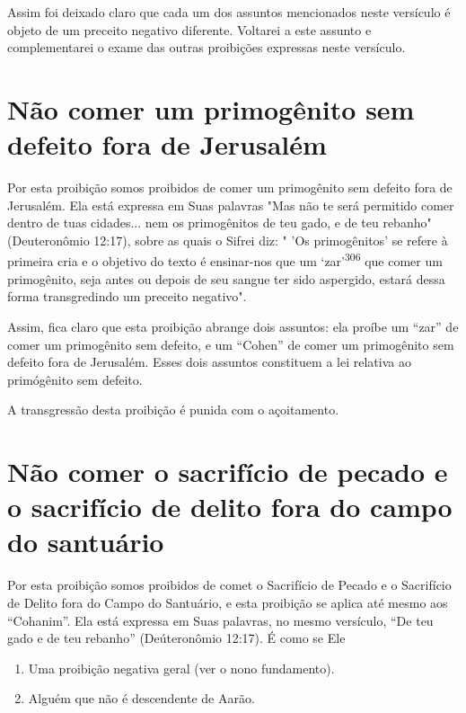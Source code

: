 Assim foi deixado claro que cada um dos assuntos mencionados neste
versículo é objeto de um preceito negativo diferente. Voltarei a este
assunto e complementarei o exame das outras proibições expressas neste
versículo.

\section{Não comer um primogênito sem defeito fora de Jerusalém}

Por esta proibição somos proibidos de comer um primogênito sem defeito
fora de Jerusalém. Ela está expressa em Suas palavras "Mas não te será
permitido comer dentro de tuas cidades... nem os primogênitos de teu
gado, e de teu rebanho" (Deuteronômio 12:17), sobre as quais o Sifrei
diz: " 'Os pri­mogênitos' se refere à primeira cria e o objetivo do
texto é ensinar-nos que um `zar'\textsuperscript{306} que comer um
primogênito, seja antes ou depois de seu sangue ter sido aspergido,
estará dessa forma transgredindo um preceito negativo".

Assim, fica claro que esta proibição abrange dois assuntos: ela proí­be
um ``zar'' de comer um primogênito sem defeito, e um ``Cohen'' de comer um
primogênito sem defeito fora de Jerusalém. Esses dois assuntos
constituem a lei relativa ao primógênito sem defeito.

A transgressão desta proibição é punida com o açoitamento.

\section{Não comer o sacrifício de pecado e o sacrifício de delito fora 
do campo do santuário}

Por esta proibição somos proibidos de comet o Sacrifício de Pecado e o
Sacrifício de Delito fora do Campo do Santuário, e esta proibição se
aplica até mesmo aos ``Cohanim''. Ela está expressa em Suas palavras, no
mesmo ver­sículo, ``De teu gado e de teu rebanho'' (Deúteronômio 12:17). É
como se Ele


\begin{enumerate}
\def\labelenumi{\arabic{enumi}.}
\setcounter{enumi}{304}
\item
 
 Uma proibição negativa geral (ver o nono fundamento).
 
\item
 
 Alguém que não é descendente de Aarão.
 
\end{enumerate}


